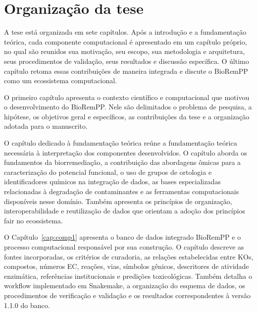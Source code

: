 \newpage
\section{Organização da tese}
\label{sec:organizacao}


A tese está organizada em sete capítulos. 
Após a introdução e a fundamentação teórica, cada componente
computacional é apresentado em um capítulo próprio, no qual são reunidos sua
motivação, seu escopo, sua metodologia e arquitetura, seus procedimentos de validação, seus
resultados e  discussão específica. O último capítulo retoma essas contribuições de maneira
integrada e discute o BioRemPP como um ecossistema computacional.

O primeiro capítulo apresenta o contexto científico e computacional que
motivou o desenvolvimento do BioRemPP. Nele são delimitados o problema de
pesquisa, a hipótese, os objetivos geral e específicos, as contribuições da
tese e a organização adotada para o manuscrito.

O capítulo dedicado à fundamentação teórica reúne a fundamentação teórica necessária à
interpretação dos componentes desenvolvidos. O capítulo aborda os fundamentos
da biorremediação, a contribuição das abordagens ômicas para a caracterização
do potencial funcional, o uso de grupos de ortologia e
identificadores químicos na integração de dados, as bases especializadas
relacionadas à degradação de contaminantes e as ferramentas computacionais
disponíveis nesse domínio. Também apresenta os princípios de organização,
interoperabilidade e reutilização de dados que orientam a adoção dos princípios
\gls{fair} no ecossistema.

O Capítulo~\ref{cap:comp1} apresenta o banco de dados integrado BioRemPP e o
processo computacional responsável por sua construção. O capítulo descreve as
fontes incorporadas, os critérios de curadoria, as relações estabelecidas entre
KOs, compostos, números EC, reações, vias, símbolos gênicos, descritores de
atividade enzimática, referências institucionais e predições toxicológicas.
Também detalha o workflow implementado em Snakemake, a organização do esquema
de dados, os procedimentos de verificação e validação e os resultados
correspondentes à versão 1.1.0 do banco.

